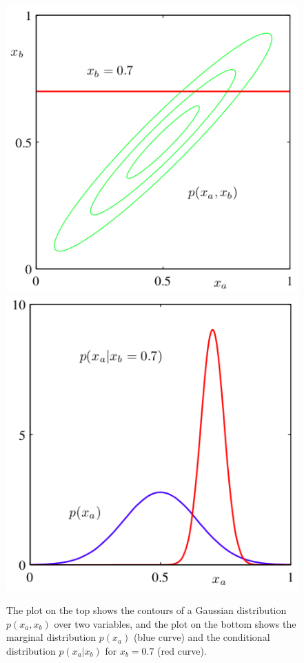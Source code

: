 \documentclass[5p,sort&compress]{elsarticle}
\begin{document}
\begin{figure}
     \centering
     \includegraphics[width = \linewidth]{figure/fig2-9-1.png}
     \includegraphics[width = \linewidth]{figure/fig2-9-2.png}     
     \caption{The plot on the top shows the contours of a Gaussian distribution $p(x_a, x_b)$ over two variables, and the plot on the bottom shows the marginal distribution $p(x_a)$ (blue curve) and the conditional distribution $p(x_a | x_b)$ for $x_b = 0.7$ (red curve).}
     \label{fig:2.9}
\end{figure}
\end{document}
